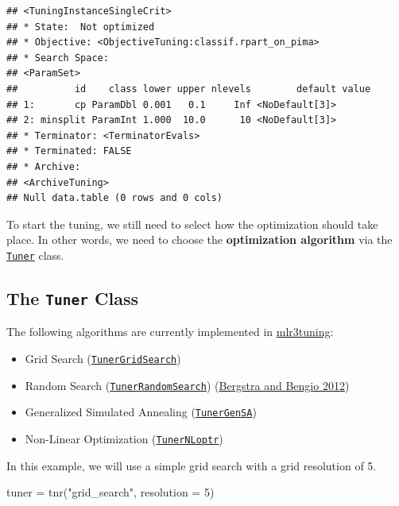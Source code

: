\documentclass[
]{scrbook}
\newenvironment{Shaded}{\begin{snugshade}}{\end{snugshade}}
\newcommand{\AttributeTok}[1]{\textcolor[rgb]{0.77,0.63,0.00}{#1}}
\newcommand{\DecValTok}[1]{\textcolor[rgb]{0.00,0.00,0.81}{#1}}
\newcommand{\FunctionTok}[1]{\textcolor[rgb]{0.00,0.00,0.00}{#1}}
\newcommand{\NormalTok}[1]{#1}
\newcommand{\OtherTok}[1]{\textcolor[rgb]{0.56,0.35,0.01}{#1}}
\newcommand{\StringTok}[1]{\textcolor[rgb]{0.31,0.60,0.02}{#1}}
\providecommand{\tightlist}{%
  \setlength{\itemsep}{0pt}\setlength{\parskip}{0pt}}
\renewenvironment{Shaded} {\begin{snugshade}\small} {\end{snugshade}}
\begin{document}
\begin{verbatim}
## <TuningInstanceSingleCrit>
## * State:  Not optimized
## * Objective: <ObjectiveTuning:classif.rpart_on_pima>
## * Search Space:
## <ParamSet>
##          id    class lower upper nlevels        default value
## 1:       cp ParamDbl 0.001   0.1     Inf <NoDefault[3]>      
## 2: minsplit ParamInt 1.000  10.0      10 <NoDefault[3]>      
## * Terminator: <TerminatorEvals>
## * Terminated: FALSE
## * Archive:
## <ArchiveTuning>
## Null data.table (0 rows and 0 cols)
\end{verbatim}

To start the tuning, we still need to select how the optimization should take place.
In other words, we need to choose the \textbf{optimization algorithm} via the \href{https://mlr3tuning.mlr-org.com/reference/Tuner.html}{\texttt{Tuner}} class.

\hypertarget{tuning-algorithms}{%
\subsection{\texorpdfstring{The \texttt{Tuner} Class}{The Tuner Class}}\label{tuning-algorithms}}

The following algorithms are currently implemented in \href{https://mlr3tuning.mlr-org.com}{mlr3tuning}:

\begin{itemize}
\tightlist
\item
  Grid Search (\href{https://mlr3tuning.mlr-org.com/reference/mlr_tuners_grid_search.html}{\texttt{TunerGridSearch}})
\item
  Random Search (\href{https://mlr3tuning.mlr-org.com/reference/mlr_tuners_random_search.html}{\texttt{TunerRandomSearch}}) (\protect\hyperlink{ref-bergstra2012}{Bergstra and Bengio 2012})
\item
  Generalized Simulated Annealing (\href{https://mlr3tuning.mlr-org.com/reference/mlr_tuners_gensa.html}{\texttt{TunerGenSA}})
\item
  Non-Linear Optimization (\href{https://mlr3tuning.mlr-org.com/reference/mlr_tuners_nloptr.html}{\texttt{TunerNLoptr}})
\end{itemize}

In this example, we will use a simple grid search with a grid resolution of 5.

\begin{Shaded}
\begin{Highlighting}[]
\NormalTok{tuner }\OtherTok{=} \FunctionTok{tnr}\NormalTok{(}\StringTok{"grid\_search"}\NormalTok{, }\AttributeTok{resolution =} \DecValTok{5}\NormalTok{)}
\end{Highlighting}
\end{Shaded}
\end{document}
